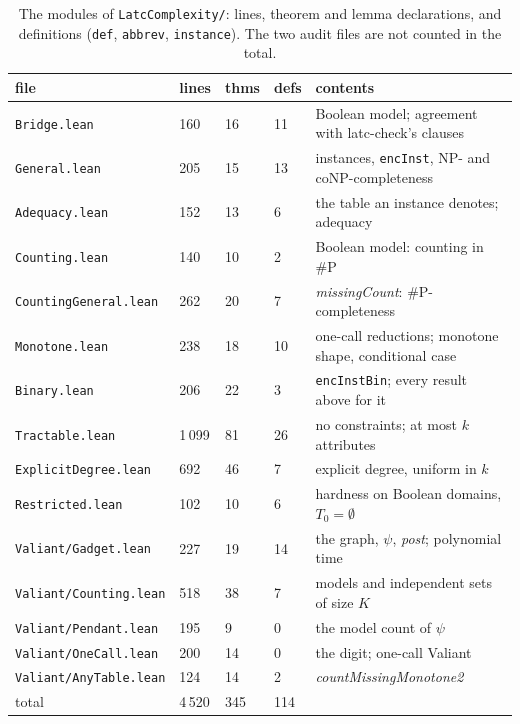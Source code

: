 \documentclass[pdflatex,sn-mathphys-num]{sn-jnl}
\theoremstyle{thmstyleone}
\theoremstyle{thmstylethree}
\begin{document}
\begin{table}[t]
\caption{The modules of \texttt{LatcComplexity/}: lines, theorem and lemma declarations, and
definitions (\texttt{def}, \texttt{abbrev}, \texttt{instance}). The two audit files
are not counted in the total.}
\label{tab:modules}
\centering\small
\begin{tabular}{L{0.27\textwidth}R{0.07\textwidth}R{0.08\textwidth}R{0.06\textwidth}L{0.36\textwidth}}
\hline
file & lines & thms & defs & contents \\
\hline
\texttt{Bridge.lean} & 160 & 16 & 11 & Boolean model; agreement with latc-check's clauses \\
\texttt{General.lean} & 205 & 15 & 13 & instances, \texttt{encInst}, NP- and coNP-completeness \\
\texttt{Adequacy.lean} & 152 & 13 & 6 & the table an instance denotes; adequacy \\
\texttt{Counting.lean} & 140 & 10 & 2 & Boolean model: counting in \#P \\
\texttt{CountingGeneral.lean} & 262 & 20 & 7 & \textit{missingCount}: \#P-completeness \\
\texttt{Monotone.lean} & 238 & 18 & 10 & one-call reductions; monotone shape, conditional case \\
\texttt{Binary.lean} & 206 & 22 & 3 & \texttt{encInstBin}; every result above for it \\
\texttt{Tractable.lean} & 1\,099 & 81 & 26 & no constraints; at most $k$ attributes \\
\texttt{ExplicitDegree.lean} & 692 & 46 & 7 & explicit degree, uniform in $k$ \\
\texttt{Restricted.lean} & 102 & 10 & 6 & hardness on Boolean domains, $T_0 = \emptyset$ \\
\texttt{Valiant/Gadget.lean} & 227 & 19 & 14 & the graph, $\psi$, \textit{post}; polynomial time \\
\texttt{Valiant/Counting.lean} & 518 & 38 & 7 & models and independent sets of size $K$ \\
\texttt{Valiant/Pendant.lean} & 195 & 9 & 0 & the model count of $\psi$ \\
\texttt{Valiant/OneCall.lean} & 200 & 14 & 0 & the digit; one-call Valiant \\
\texttt{Valiant/AnyTable.lean} & 124 & 14 & 2 & \textit{countMissingMonotone2} \\
\hline
total & 4\,520 & 345 & 114 & \\
\hline
\end{tabular}
\end{table}
\end{document}
